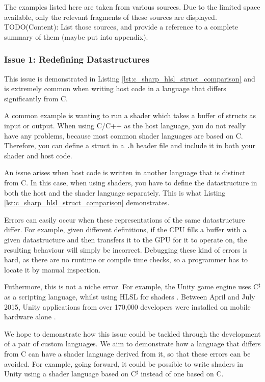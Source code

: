 \documentclass[a4paper,12pt,twoside,openright]{report}
\begin{document}
The examples listed here are taken from various sources. Due to the limited
space available, only the relevant fragments of these sources are displayed.
TODO(Content): List those sources, and provide a reference to a complete summary of
them (maybe put into appendix).

\subsubsection{Issue 1: Redefining Datastructures}

This issue is demonstrated in Listing \ref{lst:c_sharp_hlsl_struct_comparison}
and is extremely common when writing host code in a language that differs
significantly from C.

A common example is wanting to run a shader which takes a buffer of structs as
input or output. When using C/C++ as the host language, you do not really have
any problems, because most common shader languages are based on C. Therefore,
you can define a struct in a \texttt{.h} header file and include it in both
your shader and host code.

An issue arises when host code is written in another language that is distinct
from C. In this case, when using shaders, you have to define the datastructure
in both the host and the shader language separately. This is what Listing
\ref{lst:c_sharp_hlsl_struct_comparison} demonstrates.

Errors can easily occur when these representations of the same datastructure
differ. For example, given different definitions, if the CPU fills a buffer
with a given datastructure and then transfers it to the GPU for it to operate
on, the resulting behaviour will simply be incorrect. Debugging these kind of
errors is hard, as there are no runtime or compile time checks, so a programmer
has to locate it by manual inspection.

Futhermore, this is not a niche error. For example, the Unity game engine uses
C$^\sharp$ as a scripting language, whilst using HLSL for shaders \cite{TODO}.
Between April and July 2015, Unity applications from over 170,000 developers
were installed on mobile hardware alone \cite{UnityByTheNumbers}.

We hope to demonstrate how this issue could be tackled through the development
of a pair of custom languages. We aim to demonstrate how a language that differs
from C can have a shader language derived from it, so that these errors can
be avoided. For example, going forward, it could be possible to write shaders
in Unity using a shader language based on C$^\sharp$ instead of one based on C.
\end{document}
